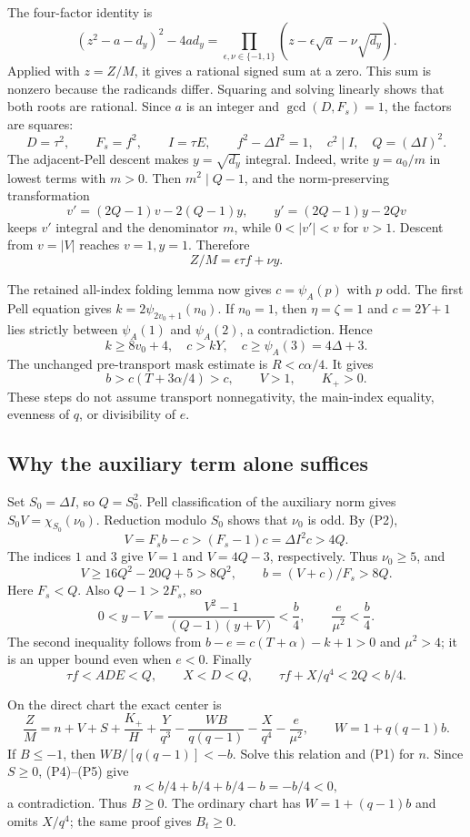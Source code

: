 The four-factor identity is
\[
 (z^2-a-d_y)^2-4ad_y
 =\prod_{\epsilon,\nu\in\{-1,1\}}
       (z-\epsilon\sqrt a-\nu\sqrt{d_y}).
\]
Applied with $z=Z/M$, it gives a rational signed sum at a zero. This sum is nonzero because the radicands differ. Squaring and solving linearly shows that both roots are rational. Since $a$ is an integer and $\gcd(D,F_s)=1$, the factors are squares:
\[
 D=\tau^2,\qquad F_s=f^2,\qquad I=\tau E,
 \qquad f^2-\Delta I^2=1,\quad c^2\mid I,\quad Q=(\Delta I)^2.
\]
The adjacent-Pell descent makes $y=\sqrt{d_y}$ integral. Indeed, write $y=a_0/m$ in lowest terms with $m>0$. Then $m^2\mid Q-1$, and the norm-preserving transformation
\[
 v'=(2Q-1)v-2(Q-1)y,\qquad y'=(2Q-1)y-2Qv
\]
keeps $v'$ integral and the denominator $m$, while $0<|v'|<v$ for $v>1$. Descent from $v=|V|$ reaches $v=1,y=1$. Therefore
\[
 Z/M=\epsilon\tau f+\nu y. \tag{P1}
\]

The retained all-index folding lemma now gives $c=\psi_A(p)$ with $p$ odd. The first Pell equation gives $k=2\psi_{2v_0+1}(n_0)$. If $n_0=1$, then $\eta=\zeta=1$ and $c=2Y+1$ lies strictly between $\psi_A(1)$ and $\psi_A(2)$, a contradiction. Hence
\[
 k\ge8v_0+4,\quad c>kY,\quad c\ge\psi_A(3)=4\Delta+3.
\]
The unchanged pre-transport mask estimate is $R<c\alpha/4$. It gives
\[
 b>c(T+3\alpha/4)>c,\qquad V>1,\qquad K_+>0. \tag{P2}
\]
These steps do not assume transport nonnegativity, the main-index equality, evenness of $q$, or divisibility of $e$.

\subsection{Why the auxiliary term alone suffices}
Set $S_0=\Delta I$, so $Q=S_0^2$. Pell classification of the auxiliary norm gives $S_0V=\chi_{S_0}(\nu_0)$. Reduction modulo $S_0$ shows that $\nu_0$ is odd. By (P2),
\[
 V=F_sb-c>(F_s-1)c=\Delta I^2c>4Q.
\]
The indices $1$ and $3$ give $V=1$ and $V=4Q-3$, respectively. Thus $\nu_0\ge5$, and
\[
 V\ge16Q^2-20Q+5>8Q^2,\qquad
 b=(V+c)/F_s>8Q. \tag{P3}
\]
Here $F_s<Q$. Also $Q-1>2F_s$, so
\[
 0<y-V=\frac{V^2-1}{(Q-1)(y+V)}<\frac b4,
 \qquad \frac e{\mu^2}<\frac b4. \tag{P4}
\]
The second inequality follows from $b-e=c(T+\alpha)-k+1>0$ and $\mu^2>4$; it is an upper bound even when $e<0$. Finally
\[
 \tau f<ADE<Q,\qquad X<D<Q,
 \qquad \tau f+X/q^4<2Q<b/4. \tag{P5}
\]

On the direct chart the exact center is
\[
 \frac ZM=n+V+S+\frac{K_+}H+\frac Y{q^3}
 -\frac{WB}{q(q-1)}-\frac X{q^4}-\frac e{\mu^2},
 \qquad W=1+q(q-1)b.
\]
If $B\le-1$, then $WB/[q(q-1)]<-b$. Solve this relation and (P1) for $n$. Since $S\ge0$, (P4)--(P5) give
\[
 n<b/4+b/4+b/4-b=-b/4<0,
\]
a contradiction. Thus $B\ge0$. The ordinary chart has $W=1+(q-1)b$ and omits $X/q^4$; the same proof gives $B_t\ge0$.

